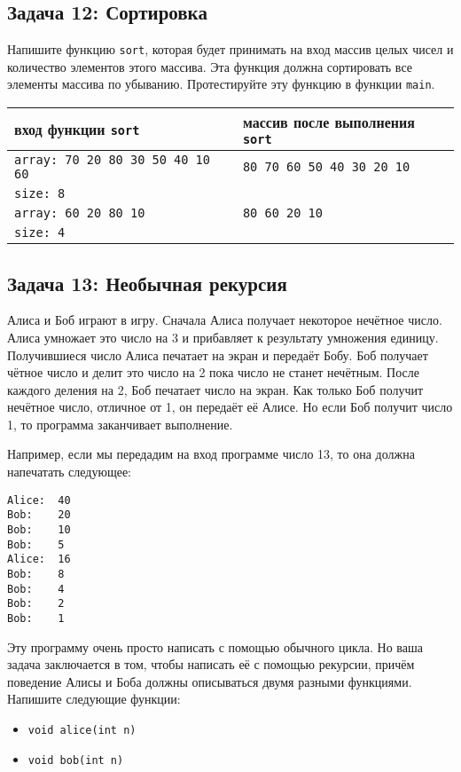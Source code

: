 \documentclass{article}
\begin{document}
\subsection*{Задача 12: Сортировка}
Напишите функцию \texttt{sort}, которая будет принимать на вход массив целых чисел и количество элементов этого массива. Эта функция должна сортировать все элементы массива по убыванию. Протестируйте эту функцию в функции \texttt{main}.
\begin{center}
\begin{tabular}{ l | l }
 вход функции \texttt{sort} & массив после выполнения \texttt{sort} \\ \hline
 \texttt{array: 70 20 80 30 50 40 10 60} & \texttt{80 70 60 50 40 30 20 10} \\
 \texttt{size: 8} & \\ \hline
 \texttt{array: 60 20 80 10} & \texttt{80 60 20 10} \\
 \texttt{size: 4} & \\
\end{tabular}
\end{center} 


\subsection*{Задача 13: Необычная рекурсия}
Алиса и Боб играют в игру. Сначала Алиса получает некоторое нечётное число. Алиса умножает это число на 3 и прибавляет к результату умножения единицу. Получившиеся число Алиса печатает на экран и передаёт Бобу. Боб получает чётное число и делит это число на 2 пока число не станет нечётным. После каждого деления на 2, Боб печатает число на экран. Как только Боб получит нечётное число, отличное от 1, он передаёт её Алисе. Но если Боб получит число 1, то программа заканчивает выполнение.

Например, если мы передадим на вход программе число 13, то она должна напечатать следующее:

\begin{verbatim}
Alice:  40
Bob:    20
Bob:    10
Bob:    5
Alice:  16
Bob:    8
Bob:    4
Bob:    2
Bob:    1
\end{verbatim}

Эту программу очень просто написать с помощью обычного цикла. Но ваша задача заключается в том, чтобы написать её с помощью рекурсии, причём поведение Алисы и Боба должны описываться двумя разными функциями. Напишите следующие функции:

\begin{itemize}
\item \texttt{void alice(int n)}
\item \texttt{void bob(int n)}
\end{itemize}
\end{document}
